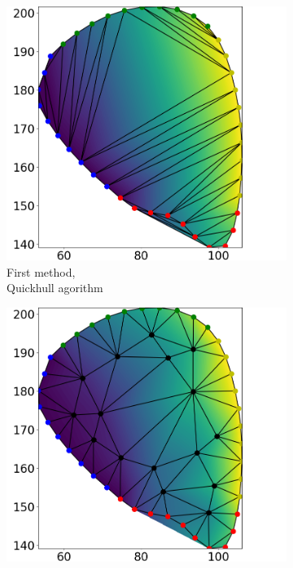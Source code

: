 \begin{figure}%
  \centering%
  \begin{subfigure}[t]{0.31\textwidth}%
    \centering%
    \includegraphics[width=\textwidth]{images/fiber_creation/u_0.png}%
    \caption{First method,\\Quickhull agorithm}%
    \label{fig:triu_0}%
  \end{subfigure}
  \quad
  \begin{subfigure}[t]{0.31\textwidth}%
    \centering%
    \includegraphics[width=\textwidth]{images/fiber_creation/u_1.png}%

\end{subfigure}
\end{figure}
